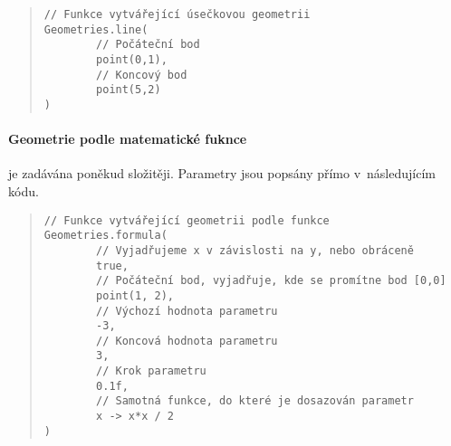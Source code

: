 \begin{minipage}{\textwidth}\begin{quote}\begin{lstlisting}
// Funkce vytvářející úsečkovou geometrii
Geometries.line(
        // Počáteční bod
        point(0,1),
        // Koncový bod
        point(5,2)
)
\end{lstlisting}\end{quote}\end{minipage}


\beautypage

\paragraph{Geometrie podle matematické fuknce} je zadávána poněkud složitěji. Parametry jsou popsány přímo v~následujícím kódu.


\begin{minipage}{\textwidth}\begin{quote}\begin{lstlisting}
// Funkce vytvářející geometrii podle funkce
Geometries.formula(
        // Vyjadřujeme x v závislosti na y, nebo obráceně
        true,
        // Počáteční bod, vyjadřuje, kde se promítne bod [0,0]
        point(1, 2),
        // Výchozí hodnota parametru
        -3,
        // Koncová hodnota parametru
        3,
        // Krok parametru
        0.1f,
        // Samotná funkce, do které je dosazován parametr
        x -> x*x / 2
)
\end{lstlisting}\end{quote}\end{minipage}


